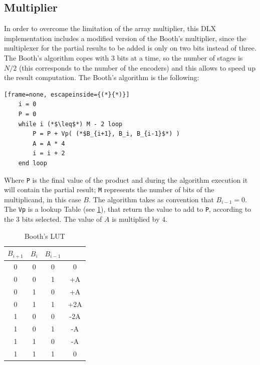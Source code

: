 \subsection{Multiplier}
In order to overcome the limitation of the array multiplier, this DLX implementation includes a modified version of the Booth's multiplier, since the multiplexer for the partial results to be added is only on two bits instead of three. The Booth's algorithm copes with 3 bits at a time, so the number of stages is $N/2$ (this corresponds to the number of the encoders) and this allows to speed up the result computation. 
The Booth's algorithm is the following:
\begin{lstlisting}[frame=none, escapeinside={(*}{*)}]
    i = 0
    P = 0
    while i (*$\leq$*) M - 2 loop
        P = P + Vp( (*$B_{i+1}, B_i, B_{i-1}$*) )
        A = A * 4
        i = i + 2
    end loop
\end{lstlisting}
Where \texttt{P} is the final value of the product and during the algorithm execution it will contain the partial result; \texttt{M} represents the number of bits of the multiplicand, in this case $B$. The algorithm takes as convention that $B_{i-1} = 0$. The \texttt{Vp} is a lookup Table (see \ref{mult:lut}), that return the value to add to \texttt{P}, according to the 3 bits selected. The value of $A$ is multiplied by 4.

\begin{table}[H]
    \begin{center}
        \begin{tabular}{ c c c | c}
            $B_{i+1}$ & $B_{i}$ & $B_{i-1}$ & \\
            \hline 
            0 & 0 & 0 & 0\\ 
            0 & 0 & 1 & +A\\ 
            0 & 1 & 0 & +A\\ 
            0 & 1 & 1 & +2A\\ 
            1 & 0 & 0 & -2A\\ 
            1 & 0 & 1 & -A\\ 
            1 & 1 & 0 & -A\\ 
            1 & 1 & 1 & 0\\ 
        \end{tabular}
        \caption{Booth's LUT}
        \label{mult:lut}
    \end{center}
\end{table}

